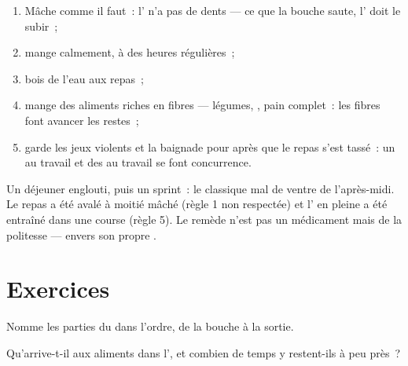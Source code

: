 \begin{method}\label{met:g4:journey-of-food:habits}
\begin{enumerate}
  \item Mâche comme il faut~: l' n'a pas de dents --- ce que
        la bouche saute, l' doit le subir~;
  \item mange calmement, à des heures régulières~;
  \item bois de l'eau aux repas~;
  \item mange des aliments riches en fibres --- légumes, ,
        pain complet~: les fibres font avancer les restes~;
  \item garde les jeux violents et la baignade pour après que le
        repas s'est tassé~: un  au travail et des  au
        travail se font concurrence.
\end{enumerate}
\end{method}

\begin{example}\label{ex:g4:journey-of-food:ache}
Un déjeuner englouti, puis un sprint~: le classique mal de ventre de
l'après-midi. Le repas a été avalé à moitié mâché (règle 1 non
respectée) et l' en pleine  a été entraîné dans une
course (règle 5). Le remède n'est pas un médicament mais de la
politesse --- envers son propre .
\end{example}

\section{Exercices}

\begin{exercise}[$\star$]\label{exo:g4:journey-of-food:1}
Nomme les parties du  dans l'ordre, de la bouche à la
sortie.
\end{exercise}

\begin{exercise}[$\star$]\label{exo:g4:journey-of-food:2}
Qu'arrive-t-il aux aliments dans l', et combien de temps y
restent-ils à peu près~?
\end{exercise}

